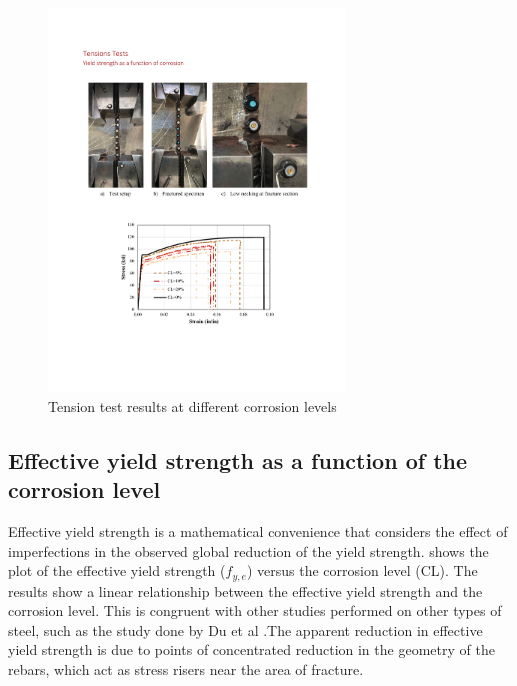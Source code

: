 \begin{figure}[htbp]
	\centering
	\includegraphics[width=0.7\textwidth]{VAC Thesis 2.0/Chapter-4/figs/TensionTest_results_1.pdf}
	\caption{Tension test results at different corrosion levels}
	\label{fig:TensionTestResults_StressStrain}
\end{figure}

\subsection{Effective yield strength as a function of the corrosion level}

Effective yield strength is a mathematical convenience that considers the effect of imperfections in the observed global reduction of the yield strength.  shows the plot of the effective yield strength ($f_{y,e}$) versus the corrosion level (CL). The results show a linear relationship between the effective yield strength and the corrosion level. This is congruent with other studies performed on other types of steel, such as the study done by Du et al \cite{Du2005}.The apparent reduction in effective yield strength is due to points of concentrated reduction in the geometry of the rebars, which act as stress risers near the area of fracture.

